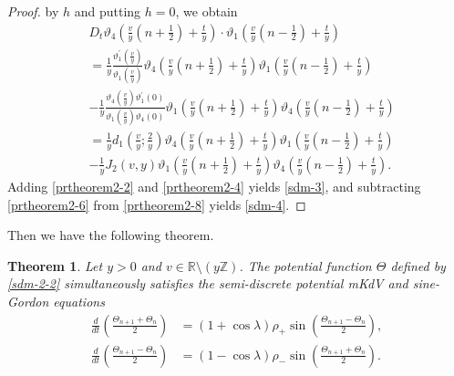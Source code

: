 \documentclass[10pt,leqno]{amsart}
\newcommand{\R}{\mathbb{R}}
\newtheorem{theorem}{Theorem}[section]
\numberwithin{equation}{section}
\begin{document}
\begin{proof}
by $h$ and putting $h=0$, we obtain
\begin{equation}\label{prtheorem2-8}
\begin{split}
&D_{t}\vartheta_4\left(\frac{v}{y}\left(n+\frac{1}{2}\right)+\frac{t}{y}\right) \cdot \vartheta_1\left(\frac{v}{y}\left(n-\frac{1}{2}\right)+\frac{t}{y}\right)\\
&=\frac{1}{y}\frac{\vartheta^{'}_{1}\left(\frac{v}{y}\right)}{\vartheta_{1}\left(\frac{v}{y}\right)}\vartheta_4\left(\frac{v}{y}\left(n+\frac{1}{2}\right)+\frac{t}{y}\right)\vartheta_1\left(\frac{v}{y}\left(n-\frac{1}{2}\right)+\frac{t}{y}\right)\\
&-\frac{1}{y}\frac{\vartheta_{4}\left(\frac{v}{y}\right)\vartheta^{'}_{1}\left(0\right)}{\vartheta_{1}\left(\frac{v}{y}\right)\vartheta_{4}\left(0\right)}\vartheta_1\left(\frac{v}{y}\left(n+\frac{1}{2}\right)+\frac{t}{y}\right)\vartheta_4\left(\frac{v}{y}\left(n-\frac{1}{2}\right)+\frac{t}{y}\right)\\
&=\frac{1}{y}d_{1}\left(\frac{v}{y};\frac{2}{y}\right)\vartheta_4\left(\frac{v}{y}\left(n+\frac{1}{2}\right)+\frac{t}{y}\right)\vartheta_1\left(\frac{v}{y}\left(n-\frac{1}{2}\right)+\frac{t}{y}\right)\\
&-\frac{1}{y}J_{2}(v,y)\vartheta_1\left(\frac{v}{y}\left(n+\frac{1}{2}\right)+\frac{t}{y}\right)\vartheta_4\left(\frac{v}{y}\left(n-\frac{1}{2}\right)+\frac{t}{y}\right).
\end{split}
\end{equation}
Adding \eqref{prtheorem2-2} and \eqref{prtheorem2-4} yields \eqref{sdm-3}, and subtracting \eqref{prtheorem2-6} from \eqref{prtheorem2-8} yields \eqref{sdm-4}. 
\end{proof}
Then we have the following theorem.
\begin{theorem}\label{thm:sdm}
Let $y>0$ and $v \in \R \setminus{(y\mathbb{Z})}$.
The potential function $\Theta$ defined by \eqref{sdm-2-2} simultaneously satisfies the semi-discrete potential mKdV 
and sine-Gordon equations
\begin{align}
\frac{d}{dt}\left(\frac{\Theta_{n+1}+\Theta_{n}}{2}\right) & =\left(1+\cos\lambda\right)\rho_{+}\sin\left(\frac{\Theta_{n+1}-\Theta_{n}}{2}\right),
\label{sdm-1} \\
\frac{d}{dt}\left(\frac{\Theta_{n+1}-\Theta_{n}}{2}\right)&=\left(1-\cos\lambda\right)\rho_{-}\sin\left(\frac{\Theta_{n+1}+\Theta_{n}}{2}\right).
\label{sdsg-1}
\end{align}
\end{theorem}
\end{document}
